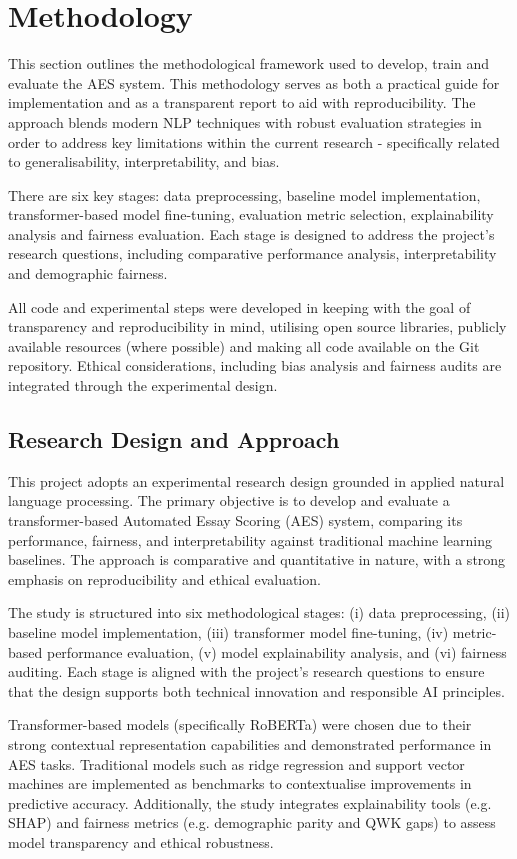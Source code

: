 \documentclass[12pt,a4paper]{report}
\begin{document}
\chapter{Methodology}
This section outlines the methodological framework used to develop, train and evaluate the AES system. This methodology serves as both a practical guide for implementation and as a transparent report to aid with reproducibility. The approach blends modern NLP techniques with robust evaluation strategies in order to address key limitations within the current research - specifically related to generalisability, interpretability, and bias.

There are six key stages: data preprocessing,  baseline model implementation, transformer-based model fine-tuning, evaluation metric selection, explainability analysis and fairness evaluation. Each stage is designed to address the project's research questions, including comparative performance analysis, interpretability and demographic fairness.

All code and experimental steps were developed in keeping with the goal of transparency and reproducibility in mind, utilising open source libraries, publicly available resources (where possible) and making all code available on the Git repository. Ethical considerations, including bias analysis and fairness audits are integrated through the experimental design.

\section{Research Design and Approach}
This project adopts an experimental research design grounded in applied natural language processing. The primary objective is to develop and evaluate a transformer-based Automated Essay Scoring (AES) system, comparing its performance, fairness, and interpretability against traditional machine learning baselines. The approach is comparative and quantitative in nature, with a strong emphasis on reproducibility and ethical evaluation.

The study is structured into six methodological stages: (i) data preprocessing, (ii) baseline model implementation, (iii) transformer model fine-tuning, (iv) metric-based performance evaluation, (v) model explainability analysis, and (vi) fairness auditing. Each stage is aligned with the project’s research questions to ensure that the design supports both technical innovation and responsible AI principles.

Transformer-based models (specifically RoBERTa) were chosen due to their strong contextual representation capabilities and demonstrated performance in AES tasks. Traditional models such as ridge regression and support vector machines are implemented as benchmarks to contextualise improvements in predictive accuracy. Additionally, the study integrates explainability tools (e.g. SHAP) and fairness metrics (e.g. demographic parity and QWK gaps) to assess model transparency and ethical robustness.
\end{document}
